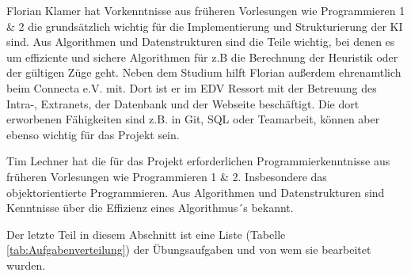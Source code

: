 \documentclass[12pt,a4paper,bibliography=totocnumbered,listof=totocnumbered]{scrartcl}
\begin{document}
    Florian Klamer hat Vorkenntnisse aus früheren Vorlesungen wie Programmieren 1 \& 2 die grundsätzlich wichtig für die Implementierung und Strukturierung der KI sind. Aus Algorithmen und Datenstrukturen sind die Teile wichtig, bei denen es um effiziente und sichere Algorithmen für z.B die Berechnung der Heuristik oder der gültigen Züge geht. Neben dem Studium hilft Florian außerdem ehrenamtlich beim Connecta e.V. mit. Dort ist er im EDV Ressort mit der Betreuung des Intra-, Extranets, der Datenbank und der Webseite beschäftigt. Die dort erworbenen Fähigkeiten sind z.B. in Git, SQL oder Teamarbeit, können aber ebenso wichtig für das Projekt sein.


    Tim Lechner hat die für das Projekt erforderlichen Programmierkenntnisse aus früheren Vorlesungen wie Programmieren 1 \& 2. Insbesondere das objektorientierte Programmieren. Aus Algorithmen und Datenstrukturen sind Kenntnisse über die Effizienz eines Algorithmus´s bekannt.  


    Der letzte Teil in diesem Abschnitt ist eine Liste (Tabelle \ref{tab:Aufgabenverteilung}) der Übungsaufgaben und von wem sie bearbeitet wurden.\newline
\end{document}
